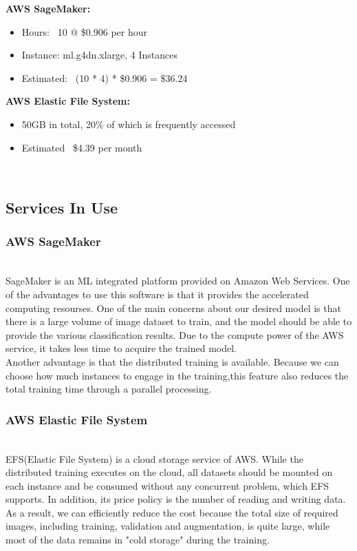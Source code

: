 \documentclass[conference]{IEEEtran}
\begin{document}
\textbf{AWS SageMaker:}
\begin{itemize}
\item Hours: ~10 @ \$0.906 per hour
\item Instance: ml.g4dn.xlarge, 4 Instances
\item Estimated: ~(10 * 4) * \$0.906 = \$36.24
\end{itemize}

\textbf{AWS Elastic File System:}
\begin{itemize}
\item 50GB in total, 20\% of which is frequently accessed
\item Estimated ~\$4.39 per month
\end{itemize}~\\

\subsection{Services In Use}
\subsubsection{AWS SageMaker}~\\
SageMaker is an ML integrated platform provided on Amazon Web Services. One of the advantages to use this software is that it provides the accelerated computing resourses. One of the main concerns about our desired model is that there is a large volume of image dataset to train, and the model should be able to provide the various classification results. Due to the compute power of the AWS service, it takes less time to acquire the trained model.\\
Another advantage is that the distributed training is available. Because we can choose how much instances to engage in the training,this feature also reduces the total training time through a parallel processing.
\newline
\subsubsection{AWS Elastic File System}~\\
EFS(Elastic File System) is a cloud storage service of AWS. While the distributed training executes on the cloud, all datasets should be mounted on each instance and be consumed without any concurrent problem, which EFS supports. In addition, its price policy is the number of reading and writing data. As a result, we can efficiently reduce the cost because the total size of required images, including training, validation and augmentation, is quite large, while most of the data remains in "cold storage" during the training.
\newline
\end{document}
